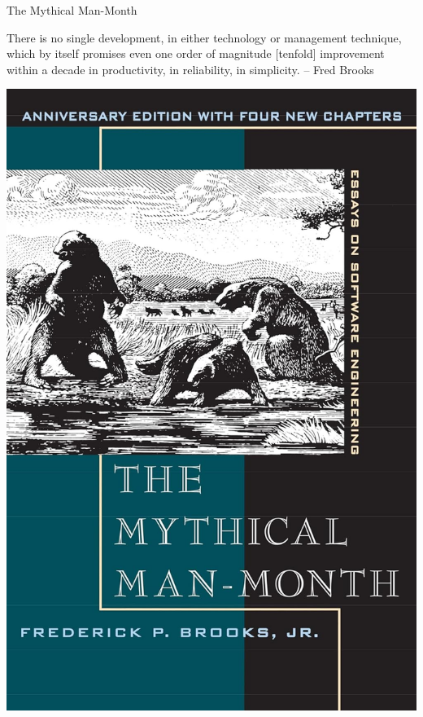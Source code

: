 \documentclass{beamer}
\begin{document}
\begin{frame}[t]{The Mythical Man-Month}

There is no single development, in either technology or management technique, which by itself promises even one order of magnitude [tenfold] improvement within a decade in productivity, in reliability, in simplicity. 
\flushright -- Fred Brooks

\centering

\includegraphics[width=.2\textwidth]{man_month.jpg} 

\end{frame}
\end{document}
